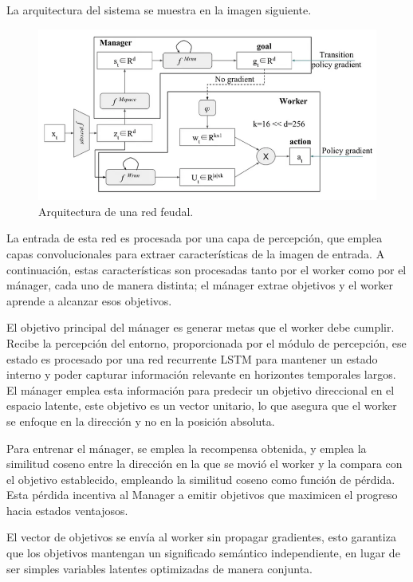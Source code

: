 \documentclass[letterpaper]{article} %
\begin{document}
La arquitectura del sistema se muestra en la imagen siguiente\cite{feudal_networks_2024}.

\begin{figure}[H]
    \centering
    \includegraphics[width=0.9\columnwidth]{feudal_arquitecture.png}
    \caption{Arquitectura de una red feudal.\label{fig:arquitectura_feudal}}
\end{figure}

La entrada de esta red es procesada por una capa de percepción, que emplea capas convolucionales
para extraer características de la imagen de entrada. A continuación, estas características son procesadas
tanto por el worker como por el mánager, cada uno de manera distinta; el mánager extrae objetivos y el worker
aprende a alcanzar esos objetivos.

El objetivo principal del mánager es generar metas que el worker debe cumplir. Recibe la percepción
del entorno, proporcionada por el módulo de percepción, ese estado es procesado por una red recurrente LSTM
para mantener un estado interno y poder capturar información relevante en horizontes temporales largos.
El mánager emplea esta información para predecir un objetivo direccional en el espacio latente, este objetivo
es un vector unitario, lo que asegura que el worker se enfoque en la dirección y no en la posición absoluta.

Para entrenar el mánager, se emplea la recompensa obtenida, y emplea la similitud coseno entre la dirección en la que 
se movió el worker y la compara con el objetivo establecido, empleando la similitud coseno como función de pérdida.
Esta pérdida incentiva al Manager a emitir objetivos que maximicen el progreso hacia estados ventajosos.

El vector de objetivos se envía al worker sin propagar gradientes, esto garantiza que los objetivos 
mantengan un significado semántico independiente, en lugar de ser simples variables latentes optimizadas de manera conjunta.
\end{document}
